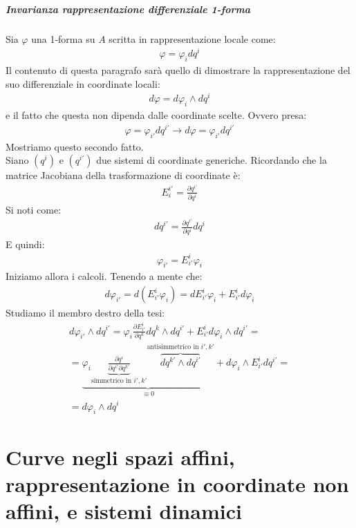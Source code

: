 \documentclass[10pt,a4paper]{book}
\begin{document}
\paragraph{Invarianza rappresentazione differenziale 1-forma}
Sia $\varphi$ una 1-forma su $A$ scritta in rappresentazione locale come:
\begin{align*}
    \varphi = \varphi_idq^i
\end{align*}
Il contenuto di questa paragrafo sarà quello di dimostrare la rappresentazione del suo differenziale in coordinate locali:
\begin{align*}
    d\varphi=d\varphi _i\wedge dq^i
\end{align*}
e il fatto che questa non dipenda dalle coordinate scelte. Ovvero presa:
\begin{align*}
    \varphi = \varphi_{i'}dq^{i'}\longrightarrow d\varphi = \varphi_{i'}dq^{i'}
\end{align*}
Mostriamo questo secondo fatto.\\
Siano $(q^i)$ e $(q^{i'})$ due sistemi di coordinate generiche. Ricordando che la matrice Jacobiana della trasformazione di coordinate è:
\begin{align*}
    E^{i'}_i=\frac{\partial q^{i'}}{\partial q^i}
\end{align*}
Si noti come:
\begin{align*}
    dq^{i'}=\frac{\partial q^{i'}}{\partial q^i}dq^i
\end{align*}
E quindi:
\begin{align*}
    \varphi_{i'}=E^i_{i'}\varphi_i
\end{align*}
Iniziamo allora i calcoli. Tenendo a mente che:
\begin{align*}
    d\varphi_{i'}=d(E^i_{i'}\varphi_i)=dE^i_{i'}\varphi_i+E^i_{i'}d\varphi_i
\end{align*}
Studiamo il membro destro della tesi:
\begin{align*}
    d\varphi_{i'}\wedge dq^{i'}=\varphi_i\frac{\partial E^{i}_{i'}}{\partial q^k}dq^k\wedge dq^{i'}+E^i_{i'}d\varphi_i\wedge dq^{i'}=\\
    =\underbrace{\varphi_i\underbrace{\frac{\partial q^i}{\partial q^{i'} \partial q^{k'}}}_{\text{simmetrico in $i',k'$}}\overbrace{dq^{k'}\wedge dq^{i'}}^{\text{antisimmetrico in $i',k'$}}}_{\equiv 0}+d\varphi_i\wedge E^i_{i'}dq^{i'}=\\
    =d\varphi_i\wedge dq^i
\end{align*}
\chapter{Curve negli spazi affini, rappresentazione in coordinate non affini, e sistemi dinamici}
\end{document}
